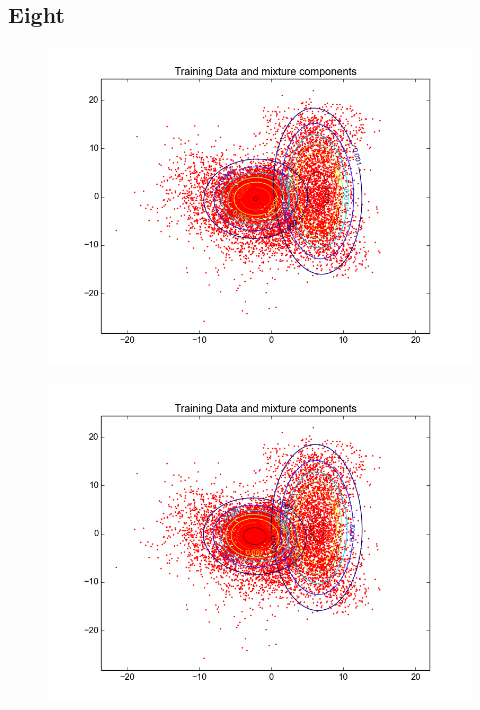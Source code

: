 \documentclass[11pt,a4paper]{article}
\begin{document}
\subsection{Eight}
\begin{minipage}[b]{0.25\textwidth}
\begin{figure}[H]
  \centering
  \includegraphics[width=.8\linewidth]{Figures/contours_digiteight0.png}
  \label{fig:sfig1}
\end{figure}%
\end{minipage}
\begin{minipage}[b]{0.25\textwidth}
\begin{figure}[H]
  \centering
  \includegraphics[width=.8\linewidth]{Figures/contours_digiteight5.png}

  \label{fig:sfig1}
\end{figure}%
\end{minipage}
\end{document}
